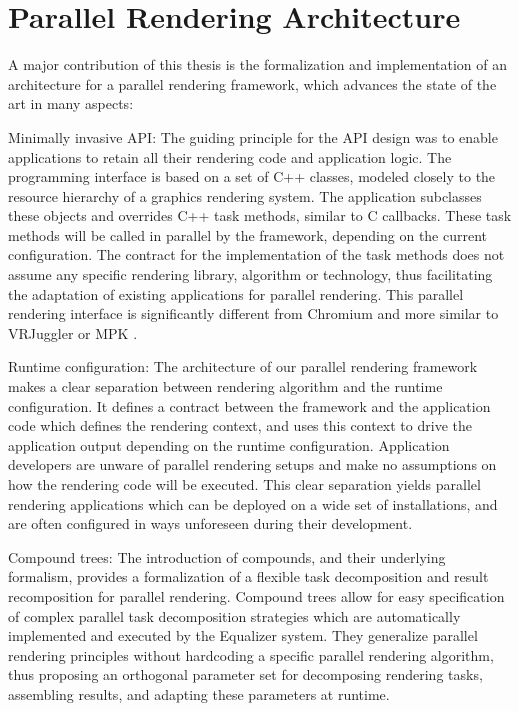 \section{Parallel Rendering Architecture}

A major contribution of this thesis is the formalization and implementation of
an architecture for a parallel rendering framework, which advances the state of
the art in many aspects:

\begin{compactdesc}

\item[Minimally invasive API:] The guiding principle for the API design was to
enable applications to retain all their rendering code and application logic.
The programming interface is based on a set of C++ classes, modeled closely to
the resource hierarchy of a graphics rendering system. The application
subclasses these objects and overrides C++ task methods, similar to C
callbacks. These task methods will be called in parallel by the framework,
depending on the current configuration. The contract for the implementation of
the task methods does not assume any specific rendering library, algorithm or
technology, thus facilitating the adaptation of existing applications for
parallel rendering. This parallel rendering interface is significantly
different from Chromium \cite{HHNFAKK:02} and more similar to VRJuggler
\cite{BJHMBC:01} or MPK \cite{BRE:05}.

\item[Runtime configuration:] The architecture of our parallel rendering
framework makes a clear separation between rendering algorithm and the runtime
configuration. It defines a contract between the framework and the application
code which defines the rendering context, and uses this context to drive the
application output depending on the runtime configuration. Application
developers are unware of parallel rendering setups and make no assumptions on
how the rendering code will be executed. This clear separation yields parallel
rendering applications which can be deployed on a wide set of installations, and
are often configured in ways unforeseen during their development.

\item[Compound trees:] The introduction of compounds, and their underlying
formalism, provides a formalization of a flexible task decomposition and result
recomposition for parallel rendering. Compound trees allow for easy specification
of complex parallel task decomposition strategies which are automatically
implemented and executed by the Equalizer system. They generalize parallel
rendering principles without hardcoding a specific parallel rendering algorithm,
thus proposing an orthogonal parameter set for decomposing rendering tasks,
assembling results, and adapting these parameters at runtime.


\end{compactdesc}
